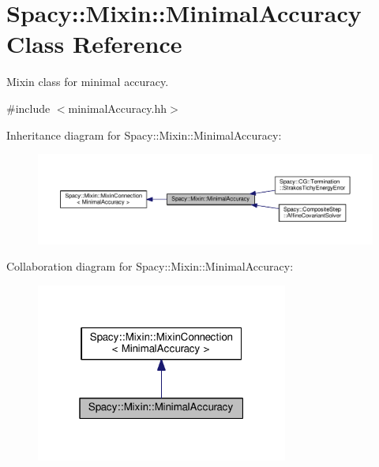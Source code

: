 \hypertarget{classSpacy_1_1Mixin_1_1MinimalAccuracy}{}\section{Spacy\+:\+:Mixin\+:\+:Minimal\+Accuracy Class Reference}
\label{classSpacy_1_1Mixin_1_1MinimalAccuracy}


Mixin class for minimal accuracy.  




{\ttfamily \#include $<$minimal\+Accuracy.\+hh$>$}



Inheritance diagram for Spacy\+:\+:Mixin\+:\+:Minimal\+Accuracy\+:\nopagebreak
\begin{figure}[H]
\begin{center}
\leavevmode
\includegraphics[width=350pt]{classSpacy_1_1Mixin_1_1MinimalAccuracy__inherit__graph}
\end{center}
\end{figure}


Collaboration diagram for Spacy\+:\+:Mixin\+:\+:Minimal\+Accuracy\+:\nopagebreak
\begin{figure}[H]
\begin{center}
\leavevmode
\includegraphics[width=235pt]{classSpacy_1_1Mixin_1_1MinimalAccuracy__coll__graph}
\end{center}
\end{figure}
